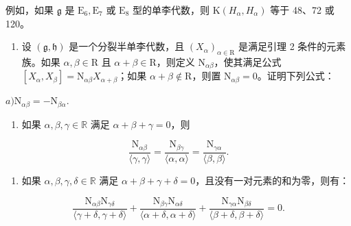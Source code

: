 例如，如果 \(\mathfrak{g}\) 是 \(\mathrm{E}_6, \mathrm{E}_7\) 或 \(\mathrm{E}_8\) 型的单李代数，则 \(\mathrm{K}(H_{\alpha}, H_{\alpha})\) 等于 48、72 或 120。

\begin{enumerate}
\def\labelenumi{\arabic{enumi})}
\setcounter{enumi}{3}
\tightlist
\item
  设 \((\mathfrak{g},\mathfrak{h})\) 是一个分裂半单李代数，且 \((X_{\alpha})_{\alpha \in \mathrm{R}}\) 是满足引理 2 条件的元素族。如果 \(\alpha ,\beta \in \mathrm{R}\) 且 \(\alpha +\beta \in \mathrm{R}\)，则定义 \(\mathrm{N}_{\alpha \beta}\)，使其满足公式 \([X_{\alpha},X_{\beta}] = \mathrm{N}_{\alpha \beta}X_{\alpha +\beta}\)；如果 \(\alpha +\beta \notin \mathrm{R}\)，则置 \(\mathrm{N}_{\alpha \beta} = 0\)。证明下列公式：
\end{enumerate}

\(a)\mathrm{N}_{\alpha \beta} = -\mathrm{N}_{\beta \alpha}.\)

\begin{enumerate}
\def\labelenumi{\alph{enumi})}
\setcounter{enumi}{1}
\tightlist
\item
  如果 \(\alpha, \beta, \gamma \in \mathbb{R}\) 满足 \(\alpha + \beta + \gamma = 0\)，则
\end{enumerate}

\[
\frac {\mathrm{N} _ {\alpha \beta}}{\langle \gamma , \gamma \rangle} = \frac {\mathrm{N} _ {\beta \gamma}}{\langle \alpha , \alpha \rangle} = \frac {\mathrm{N} _ {\gamma \alpha}}{\langle \beta , \beta \rangle}.
\]

\begin{enumerate}
\def\labelenumi{\alph{enumi})}
\setcounter{enumi}{2}
\tightlist
\item
  如果 \(\alpha, \beta, \gamma, \delta \in \mathbb{R}\) 满足 \(\alpha + \beta + \gamma + \delta = 0\)，且没有一对元素的和为零，则有：
\end{enumerate}

\[
\frac {\mathrm{N} _ {\alpha \beta} \mathrm{N} _ {\gamma \delta}}{\langle \gamma + \delta , \gamma + \delta \rangle} + \frac {\mathrm{N} _ {\beta \gamma} \mathrm{N} _ {\alpha \delta}}{\langle \alpha + \delta , \alpha + \delta \rangle} + \frac {\mathrm{N} _ {\gamma \alpha} \mathrm{N} _ {\beta \delta}}{\langle \beta + \delta , \beta + \delta \rangle} = 0.
\]

